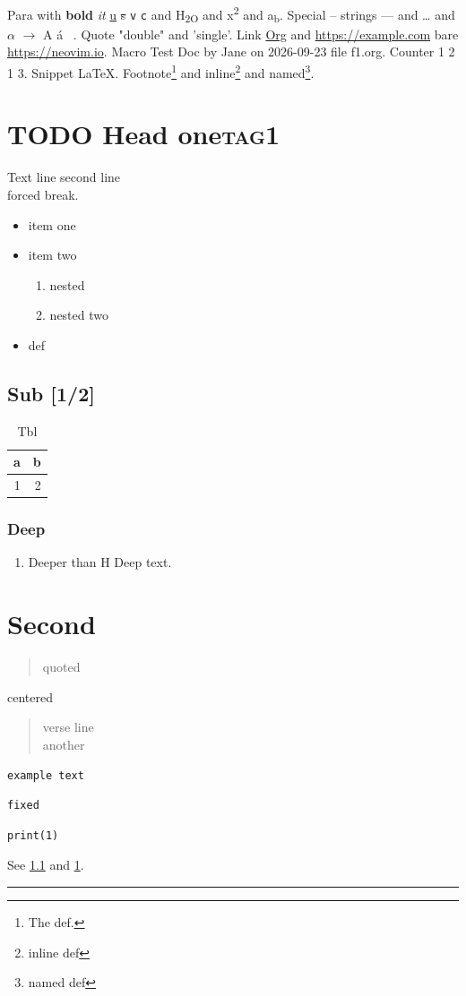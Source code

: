 Para with \textbf{bold} \emph{it} \uline{u} \sout{s} \texttt{v} \texttt{c} and H\textsubscript{2O} and x\textsuperscript{2} and a\textsubscript{b}.
Special -- strings --- and \ldots{} and \(\alpha\) \(\to\) A \'{a} ~.
Quote "double" and 'single'.
Link \href{https://orgmode.org}{Org} and \url{https://example.com} bare \url{https://neovim.io}.
Macro Test Doc by Jane on 2026-09-23 file f1.org.
Counter 1 2 1 3.
Snippet \LaTeX.
Footnote\footnote{The def.} and inline\footnote{inline def} and named\footnote{named def}.
\section{{\bfseries\sffamily TODO} Head one\hfill{}\textsc{tag1}}
\label{sec:org4008596}
Text line
second line\\
forced break.

\begin{itemize}
\item item one
\item item two
\begin{enumerate}
\item nested
\item nested two
\end{enumerate}
\item[{term}] def
\end{itemize}
\subsection{Sub [1/2]}
\label{sec:org9c53d82}
\begin{table}[htbp]
\caption{\label{tab:orgb4f901d}Tbl}
\centering
\begin{tabular}{rr}
a & b\\
\hline
1 & 2\\
\end{tabular}
\end{table}
\subsubsection{Deep}
\label{sec:org7415a7f}
\begin{enumerate}
\item Deeper than H
\label{sec:orge70adc8}
Deep text.
\end{enumerate}
\section{Second}
\label{sec:org86bc735}
\begin{quote}
quoted
\end{quote}
\begin{center}
centered
\end{center}
\begin{verse}
\hspace*{2\fontdimen2\font}verse line\\
another\\
\end{verse}
\begin{verbatim}
example text
\end{verbatim}
\begin{verbatim}
fixed
\end{verbatim}

\begin{verbatim}
print(1)
\end{verbatim}

See \ref{sec:org9c53d82} and \ref{tab:orgb4f901d}.

\noindent\rule{\textwidth}{0.5pt}
